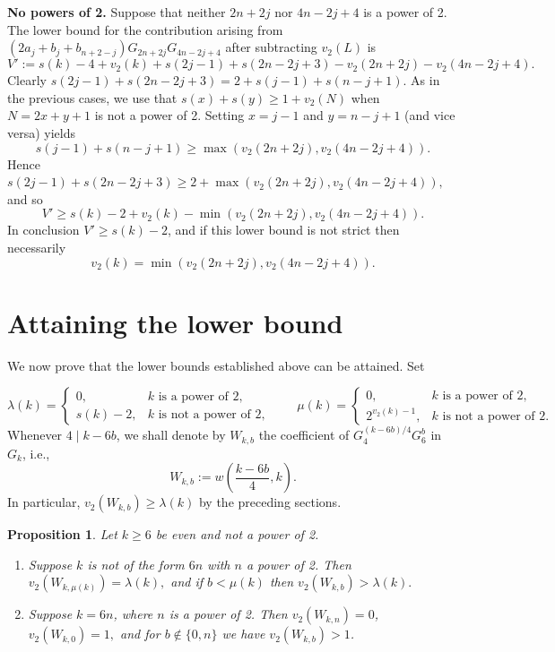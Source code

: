\documentclass[12pt]{amsart}
\newtheorem{proposition}[theorem]{Proposition}
\begin{document}
\bigskip

\noindent \textbf{No powers of 2.} Suppose that neither $2n+2j$ nor $4n-2j+4$ is a power of 2. The lower bound for the contribution arising from $(2a_j + b_j + b_{n+2-j}) G_{2n+2j} G_{4n-2j+4}$ after subtracting $v_2(L)$ is
\[ V':=s(k)-4+v_2(k)+s(2j-1)+s(2n-2j+3)-v_2(2n+2j)-v_2(4n-2j+4).\] Clearly $s(2j-1)+s(2n-2j+3) = 2 + s(j-1)+s(n-j+1)$. As in the previous cases, we use that $s(x)+s(y)\ge 1+v_2(N)$ when $N=2x+y+1$ is not a power of 2. Setting $x=j-1$ and $y=n-j+1$ (and vice versa) yields
\[ s(j-1)+s(n-j+1)\ge \max(v_2(2n+2j),v_2(4n-2j+4)).\]
Hence $s(2j-1)+s(2n-2j+3)\ge 2+\max(v_2(2n+2j),v_2(4n-2j+4)),$ and so
\[ V'\ge s(k)-2+v_2(k)-\min(v_2(2n+2j),v_2(4n-2j+4)).\] In conclusion $V'\ge s(k)-2$, and if this lower bound is not strict then necessarily
\[ v_2(k)=\min(v_2(2n+2j),v_2(4n-2j+4)).\]


\section{Attaining the lower bound} \label{attain-min}

We now prove that the lower bounds established above can be attained. Set

\[
\lambda(k)=
\begin{cases}
0, & k\text{ is a power of }2,\\
s(k)-2, & k\text{ is not a power of }2,
\end{cases}
\qquad
\mu(k)=
\begin{cases}
0, & k\text{ is a power of }2,\\
2^{v_2(k)-1}, & k\text{ is not a power of }2.
\end{cases}
\]
Whenever $4\mid k-6b$, we shall denote by $W_{k,b}$ the coefficient of  $G_4^{(k-6b)/4}G_6^b$ in $G_k$, i.e., 
\[ W_{k,b}:= w\left(\frac{k-6b}{4},k\right). \]
In particular, $ v_2(W_{k,b})\ge \lambda(k)$ by the preceding sections. 

\begin{proposition} \label{Min-Witness}
Let $k\ge 6$ be even and not a power of 2. 

	\begin{enumerate}
		\item[(a)] Suppose $k$ is not of the form $6n$ with $n$ a power of 2. Then $v_2(W_{k,\mu(k)})=\lambda(k), $ and if \(b<\mu(k)\) then $v_2(W_{k,b})>\lambda(k).$
		\item[(b)] Suppose $k=6n$, where $n$ is a power of 2. Then 
			$v_2(W_{k,n})=0$, $v_2(W_{k,0})=1,$ and for $b\notin\{0,n\}$ we have $v_2(W_{k,b})>1$. 
	\end{enumerate}
\end{proposition}
\end{document}
